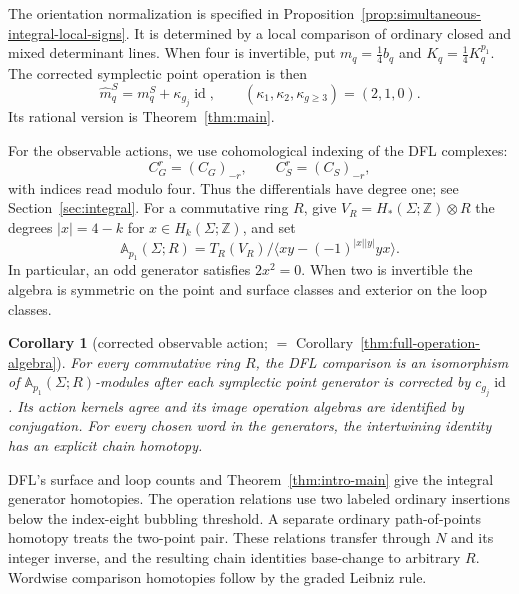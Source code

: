 \documentclass[11pt]{amsart}
\theoremstyle{definition}
\theoremstyle{remark}
\theoremstyle{plain}
\newtheorem{corletter}[letterresult]{Corollary}
\newcommand{\ZZ}{\mathbb{Z}}
\newcommand{\id}{\operatorname{id}}
\begin{document}
The orientation normalization is specified in
Proposition~\ref{prop:simultaneous-integral-local-signs}.
It is determined by a local comparison of ordinary
closed and mixed determinant lines. When four is
invertible, put $m_q=\frac14b_q$ and
$K_q=\frac14K_q^{p_1}$. The corrected symplectic
point operation is then
\[
 \widehat m_q^S=m_q^S+\kappa_{g_j}\id,\qquad
             (\kappa_1,\kappa_2,\kappa_{g\geq3})=(2,1,0).
\]
Its rational version is Theorem~\ref{thm:main}.

For the observable actions, we use cohomological indexing of
the DFL complexes:
\[
 C_G^r=(C_G)_{-r},\qquad C_S^r=(C_S)_{-r},
\]
with indices read modulo four. Thus the differentials have
degree one; see Section~\ref{sec:integral}.
For a commutative ring $R$, give
$V_R=H_*(\Sigma;\ZZ)\otimes R$ the degrees
$|x|=4-k$ for $x\in H_k(\Sigma;\ZZ)$, and set
\[
 \mathbb A_{p_1}(\Sigma;R)
   =T_R(V_R)/\langle xy-(-1)^{|x||y|}yx\rangle.
\]
In particular, an odd generator satisfies $2x^2=0$.
When two is invertible the algebra is symmetric
on the point and surface classes and exterior
on the loop classes.

\begin{corletter}[corrected observable action;
  $=$ Corollary~\ref{thm:full-operation-algebra}]
\label{thm:intro-operation-algebra}
For every commutative ring $R$, the DFL comparison
is an isomorphism of $\mathbb A_{p_1}(\Sigma;R)$-modules
after each symplectic point generator is corrected
by $c_{g_j}\id$. Its action kernels agree and its
image operation algebras are identified by conjugation.
For every chosen word in the generators, the
intertwining identity has an explicit chain homotopy.
\end{corletter}

DFL's surface and loop counts and
Theorem~\ref{thm:intro-main} give the integral
generator homotopies. The operation relations use
two labeled ordinary insertions below the
index-eight bubbling threshold. A separate ordinary
path-of-points homotopy treats the two-point pair.
These relations transfer through $N$ and its
integer inverse, and the resulting chain identities
base-change to arbitrary $R$. Wordwise comparison
homotopies follow by the graded Leibniz rule.
\end{document}
